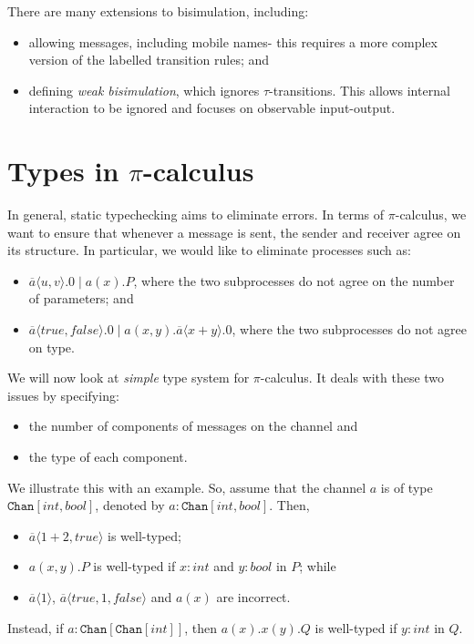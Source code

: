 \documentclass[a4paper, openany]{memoir}
\theoremstyle{definition}
\begin{document}
    There are many extensions to bisimulation, including:
    \begin{itemize}
        \item allowing messages, including mobile names- this requires a more complex version of the labelled transition rules; and
        \item defining \emph{weak bisimulation}, which ignores $\tau$-transitions. This allows internal interaction to be ignored and focuses on observable input-output.
    \end{itemize}
    \newpage

    \section{Types in $\pi$-calculus}
    In general, static typechecking aims to eliminate errors. In terms of $\pi$-calculus, we want to ensure that whenever a message is sent, the sender and receiver agree on its structure. In particular, we would like to eliminate processes such as:
    \begin{itemize}
        \item $\overline{a} \langle u, v \rangle.0 \mid a(x).P$, where the two subprocesses do not agree on the number of parameters; and
        \item $\overline{a} \langle \textit{true}, \textit{false} \rangle.0 \mid a(x, y).\overline{a} \langle x + y \rangle.0$, where the two subprocesses do not agree on type.
    \end{itemize}

    We will now look at \emph{simple} type system for $\pi$-calculus. It deals with these two issues by specifying:
    \begin{itemize}
        \item the number of components of messages on the channel and
        \item the type of each component.
    \end{itemize}
    We illustrate this with an example. So, assume that the channel $a$ is of type $\texttt{Chan}[\textit{int}, \textit{bool}]$, denoted by $a \colon \texttt{Chan}[\textit{int}, \textit{bool}]$. Then,
    \begin{itemize}
        \item $\overline{a} \langle 1 + 2, \textit{true} \rangle$ is well-typed;
        \item $a(x, y).P$ is well-typed if $x \colon \textit{int}$ and $y \colon \textit{bool}$ in $P$; while
        \item $\overline{a} \langle 1 \rangle$, $\overline{a} \langle true, 1, false \rangle$ and $a(x)$ are incorrect.
    \end{itemize}
    Instead, if $a \colon \texttt{Chan}[\texttt{Chan}[\textit{int}]]$, then $a(x).x(y).Q$ is well-typed if $y \colon \textit{int}$ in $Q$.
\end{document}
